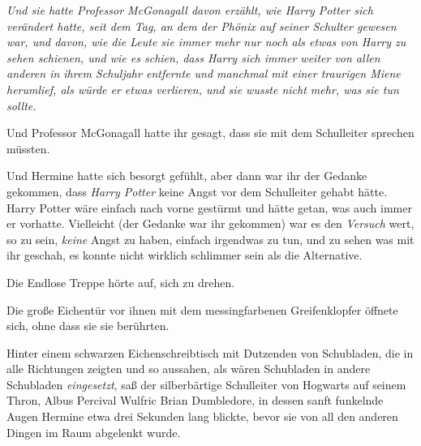 \emph{Und sie hatte Professor McGonagall davon erzählt, wie Harry Potter sich verändert hatte, seit dem Tag, an dem der Phönix auf seiner Schulter gewesen war, und davon, wie die Leute sie immer mehr nur noch als etwas von Harry zu sehen schienen, und wie es schien, dass Harry sich immer weiter von allen anderen in ihrem Schuljahr entfernte und manchmal mit einer traurigen Miene herumlief, als würde er etwas verlieren, und \emph{sie wusste nicht mehr, was sie tun sollte.}}

Und Professor McGonagall hatte ihr gesagt, dass sie mit dem Schulleiter sprechen müssten.

Und Hermine hatte sich besorgt gefühlt, aber dann war ihr der Gedanke gekommen, dass \emph{Harry Potter} keine Angst vor dem Schulleiter gehabt hätte. Harry Potter wäre einfach nach vorne gestürmt und hätte getan, was auch immer er vorhatte. Vielleicht (der Gedanke war ihr gekommen) war es den \emph{Versuch} wert, so zu sein, \emph{keine} Angst zu haben, einfach irgendwas zu tun, und zu sehen was mit ihr geschah, es konnte nicht wirklich schlimmer sein als die Alternative.

Die Endlose Treppe hörte auf, sich zu drehen.

Die große Eichentür vor ihnen mit dem messingfarbenen Greifenklopfer öffnete sich, ohne dass sie sie berührten.

Hinter einem schwarzen Eichenschreibtisch mit Dutzenden von Schubladen, die in alle Richtungen zeigten und so aussahen, als wären Schubladen in andere Schubladen \emph{eingesetzt}, saß der silberbärtige Schulleiter von Hogwarts auf seinem Thron, Albus Percival Wulfric Brian Dumbledore, in dessen sanft funkelnde Augen Hermine etwa drei Sekunden lang blickte, bevor sie von all den anderen Dingen im Raum abgelenkt wurde.

